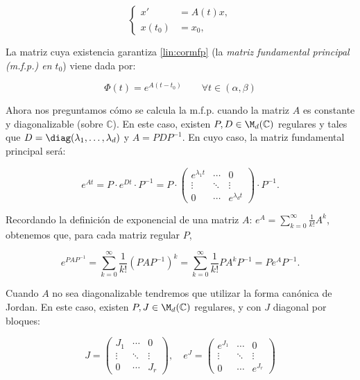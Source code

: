 \begin{equation}
\left\{\begin{array}{rl}
x' &=A(t)x, \\
x(t_0)&=x_0,
\end{array}\right.
\tag{PVIH} \label{lin:PVIH}
\end{equation}

La matriz cuya existencia garantiza \ref{lin:cormfp} (la \emph{matriz fundamental principal (m.f.p.) en $t_0$}) viene dada por:

\[ \Phi(t)=e^{A(t-t_0)} \qquad \forall t \in (\alpha,\beta) \]

Ahora nos preguntamos cómo se calcula la m.f.p. cuando la matriz $A$ es constante y diagonalizable (sobre $\mathbb{C}$). En este caso, existen $P, D \in \M_d(\mathbb{C})$ regulares y tales que $D=\diag(\lambda_1, \dots, \lambda_d)$ y $A=P D  P^{-1}$. En cuyo caso, la matriz fundamental principal será:

\[
  e^{At}=P\cdot e^{Dt}\cdot P^{-1}=P \cdot  \begin{pmatrix}e^{\lambda_1 t} & \cdots & 0 \\ \vdots & \ddots & \vdots \\0 & \cdots & e^{\lambda_d t}\end{pmatrix} \cdot P^{-1}.
\]

\begin{nota}
  Recordando la definición de exponencial de una matriz $A$: $e^A = \sum_{k=0}^\infty \frac{1}{k!} A^k$, obtenemos que, para cada matriz regular $P$,

  \[ e^{PAP^{-1}} =  \sum_{k=0}^\infty \frac{1}{k!} (PAP^{-1})^k = \sum_{k=0}^\infty \frac{1}{k!} PA^kP^{-1} = Pe^AP^{-1}. \]
\end{nota}


Cuando $A$ no sea diagonalizable tendremos que utilizar la forma canónica de Jordan. En este caso, existen $P,J\in \M_d(\mathbb{C})$ regulares, y con $J$ diagonal por bloques:

\[
  J = \begin{pmatrix}J_1 & \cdots & 0\\
 \vdots & \ddots & \vdots \\
 0& \cdots & J_r \end{pmatrix},
 \quad
 e^J = \begin{pmatrix}e^{J_1} & \cdots & 0\\
 \vdots & \ddots & \vdots \\
 0& \cdots & e^{J_r} \end{pmatrix}
\]

